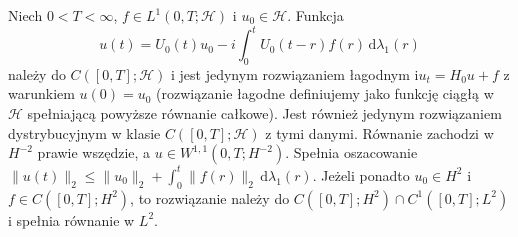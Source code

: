 \begin{twierdzenie}\label{thm:pde22-duhamel}
Niech $0<T<\infty$, $f\in L^1(0,T;\mathcal H)$ i
$u_0\in\mathcal H$. Funkcja
\[
 u(t)=U_0(t)u_0-i\int_0^tU_0(t-r)f(r)\,\mathrm d\lambda_1(r)
\]
należy do $C([0,T];\mathcal H)$ i jest jedynym
rozwiązaniem łagodnym $\mathrm i u_t=H_0u+f$
z warunkiem $u(0)=u_0$ (rozwiązanie łagodne
definiujemy jako funkcję ciągłą w $\mathcal H$
spełniającą powyższe równanie całkowe).
Jest również jedynym rozwiązaniem dystrybucyjnym
w klasie $C([0,T];\mathcal H)$ z tymi danymi.
Równanie zachodzi w $H^{-2}$ prawie wszędzie,
a $u\in W^{1,1}(0,T;H^{-2})$.
Spełnia oszacowanie
$\|u(t)\|_2\le\|u_0\|_2+\int_0^t\|f(r)\|_2\,\mathrm d\lambda_1(r)$.
Jeżeli ponadto $u_0\in H^2$ i
$f\in C([0,T];H^2)$, to rozwiązanie należy do
$C([0,T];H^2)\cap C^1([0,T];L^2)$ i spełnia równanie w $L^2$.
\end{twierdzenie}
